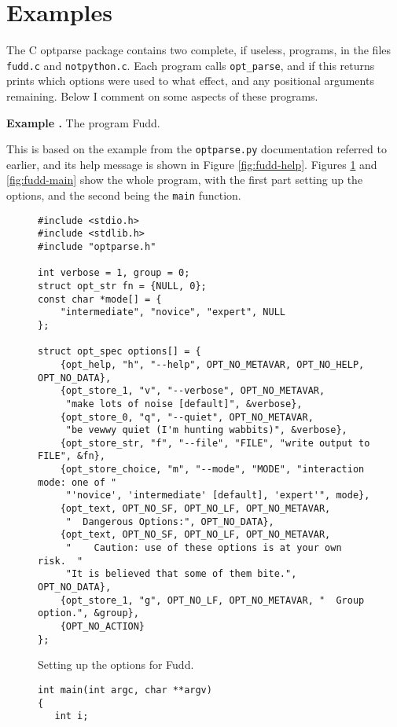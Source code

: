 \documentclass{article}
\newcounter{exnum}
\newenvironment{example}[1]
{\par\smallskip\noindent\refstepcounter{exnum}\textbf{Example
    \theexnum.} The program #1.\par\nopagebreak}
{\par\smallskip}
\renewcommand{\tt}{\texttt}
\begin{document}
\section{Examples}\label{sect:examples}
The C optparse package contains two complete, if useless, programs, in
the files \tt{fudd.c} and 
\tt{notpython.c}. Each program calls \tt{opt\_parse}, and if this
returns prints which options were used to what effect, and any
positional arguments remaining. Below I comment on some aspects of
these programs.
\begin{example}{Fudd}\label{ex:fudd}
  This is based on the example from the \tt{optparse.py} documentation
  referred to earlier, and its help message is shown in Figure
  \ref{fig:fudd-help}. Figures \ref{fig:fudd-top} and
  \ref{fig:fudd-main} show the whole program, with the first part
  setting up the options, and the second being the \tt{main}
  function. 
  \begin{figure}\small
\begin{verbatim}
#include <stdio.h>
#include <stdlib.h>
#include "optparse.h"

int verbose = 1, group = 0;
struct opt_str fn = {NULL, 0};
const char *mode[] = {
    "intermediate", "novice", "expert", NULL
};

struct opt_spec options[] = {
    {opt_help, "h", "--help", OPT_NO_METAVAR, OPT_NO_HELP, OPT_NO_DATA},
    {opt_store_1, "v", "--verbose", OPT_NO_METAVAR,
     "make lots of noise [default]", &verbose},
    {opt_store_0, "q", "--quiet", OPT_NO_METAVAR,
     "be vewwy quiet (I'm hunting wabbits)", &verbose},
    {opt_store_str, "f", "--file", "FILE", "write output to FILE", &fn},
    {opt_store_choice, "m", "--mode", "MODE", "interaction mode: one of "
     "'novice', 'intermediate' [default], 'expert'", mode},
    {opt_text, OPT_NO_SF, OPT_NO_LF, OPT_NO_METAVAR,
     "  Dangerous Options:", OPT_NO_DATA},
    {opt_text, OPT_NO_SF, OPT_NO_LF, OPT_NO_METAVAR,
     "    Caution: use of these options is at your own risk.  "
     "It is believed that some of them bite.", OPT_NO_DATA},
    {opt_store_1, "g", OPT_NO_LF, OPT_NO_METAVAR, "  Group option.", &group},
    {OPT_NO_ACTION}
};
\end{verbatim}
    \caption{Setting up the options for Fudd.}
    \label{fig:fudd-top}
  \end{figure}
  \begin{figure}\small
\begin{verbatim}
int main(int argc, char **argv)
{
   int i;


\end{verbatim}
\end{figure}
\end{example}
\end{document}
